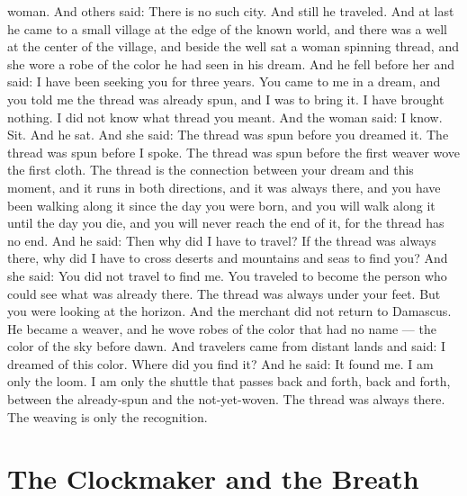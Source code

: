 \documentclass[12pt,openany]{book}
\begin{document}
woman. And others said: There is no such city. And still he traveled. And at last he came to a small village at the edge of the known world, and there was a well at the center of the village, and beside the well sat a woman spinning thread, and she wore a robe of the color he had seen in his dream. And he fell before her and said: I have been seeking you for three years. You came to me in a dream, and you told me the thread was already spun, and I was to bring it. I have brought nothing. I did not know what thread you meant. And the woman said: I know. Sit. And he sat. And she said: The thread was spun before you dreamed it. The thread was spun before I spoke. The thread was spun before the first weaver wove the first cloth. The thread is the connection between your dream and this moment, and it runs in both directions, and it was always there, and you have been walking along it since the day you were born, and you will walk along it until the day you die, and you will never reach the end of it, for the thread has no end. And he said: Then why did I have to travel? If the thread was always there, why did I have to cross deserts and mountains and seas to find you? And she said: You did not travel to find me. You traveled to become the person who could see what was already there. The thread was always under your feet. But you were looking at the horizon. And the merchant did not return to Damascus. He became a weaver, and he wove robes of the color that had no name --- the color of the sky before dawn. And travelers came from distant lands and said: I dreamed of this color. Where did you find it? And he said: It found me. I am only the loom. I am only the shuttle that passes back and forth, back and forth, between the already-spun and the not-yet-woven. The thread was always there. The weaving is only the recognition.


\chapter{The Clockmaker and the Breath}
\end{document}
